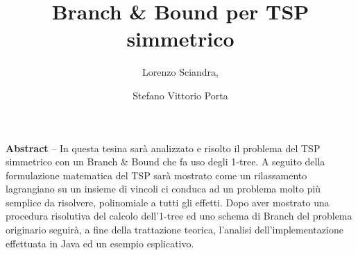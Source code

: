 \documentclass[
    article,            %
    12pt,                %
    oneside,            %
    a4paper,            %
    english,            %
    italian,                %
    sumario=tradicional,
]{abntex2}
\title{Branch \& Bound per TSP simmetrico}
\author{Lorenzo Sciandra,\and Stefano Vittorio Porta}
\begin{document}
    \textual

    \pagestyle{meuestilo}

    \frenchspacing

    \maketitle
    \thispagestyle{meuestilo}

    \begin{changemargin}{1cm}{1cm}
        \textbf{Abstract} – In questa tesina sarà analizzato e risolto il problema del TSP simmetrico con un Branch \& Bound che fa uso degli 1-tree.
        A seguito della formulazione matematica del TSP sarà mostrato come un rilassamento lagrangiano su un insieme di vincoli ci conduca ad un problema molto più semplice da risolvere, polinomiale a tutti gli effetti.
        Dopo aver mostrato una procedura risolutiva del calcolo dell'1-tree ed uno schema di Branch del problema originario seguirà, a fine della trattazione teorica, l'analisi dell'implementazione effettuata in Java ed un esempio esplicativo.

        \vspace{\onelineskip}

        \noindent
    \end{changemargin}


\end{document}
